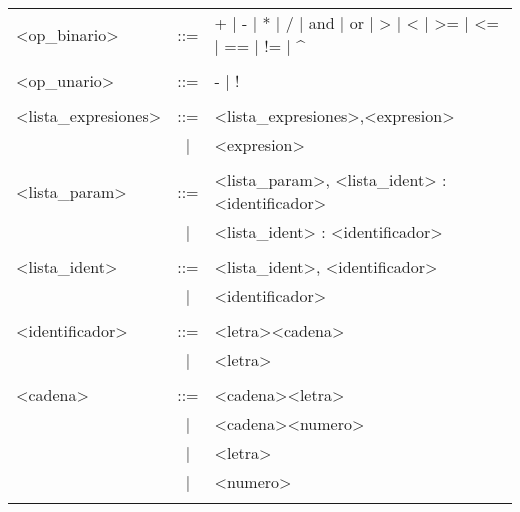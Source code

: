 \begin{tabular}{| p{3.5cm} c p{10cm} |}
<op\_binario>              &::=& + |  - |  * |  / |  and |  or |  > |  < |  >= |  <= |  == |  != |  \^{} \\
&&\\

<op\_unario>               &::=&  - |  ! \\
&&\\

<lista\_expresiones>       &::=&  <lista\_expresiones>,<expresion> \\
                           &|&  <expresion> \\
&&\\

<lista\_param>             &::=&  <lista\_param>, <lista\_ident> : <identificador>  \\
                           &|&  <lista\_ident> : <identificador> \\
&&\\

<lista\_ident>             &::=&  <lista\_ident>, <identificador> \\
                           &|&  <identificador> \\
&&\\

<identificador>           &::=&  <letra><cadena> \\
                           &|&  <letra> \\
&&\\
                         
<cadena>                  &::=&  <cadena><letra> \\
                           &|&  <cadena><numero> \\
                           &|&  <letra> \\
                           &|&  <numero> \\
&&\\
\hline
\end{tabular}
\newpage
